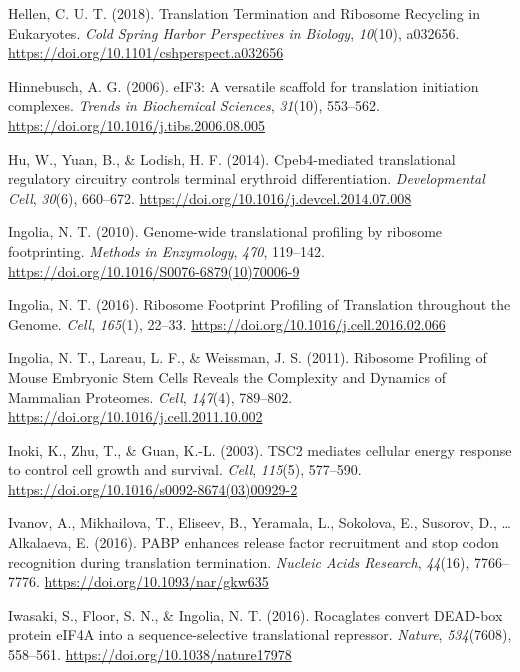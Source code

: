 \documentclass[12pt,openany]{book}
\begin{document}
\hypertarget{ref-Hellen2018}{}
Hellen, C. U. T. (2018). Translation Termination and Ribosome Recycling
in Eukaryotes. \emph{Cold Spring Harbor Perspectives in Biology},
\emph{10}(10), a032656.
\url{https://doi.org/10.1101/cshperspect.a032656}

\hypertarget{ref-Hinnebusch2006}{}
Hinnebusch, A. G. (2006). eIF3: A versatile scaffold for translation
initiation complexes. \emph{Trends in Biochemical Sciences},
\emph{31}(10), 553--562.
\url{https://doi.org/10.1016/j.tibs.2006.08.005}

\hypertarget{ref-Hu2014}{}
Hu, W., Yuan, B., \& Lodish, H. F. (2014). Cpeb4-mediated translational
regulatory circuitry controls terminal erythroid differentiation.
\emph{Developmental Cell}, \emph{30}(6), 660--672.
\url{https://doi.org/10.1016/j.devcel.2014.07.008}

\hypertarget{ref-Ingolia2010}{}
Ingolia, N. T. (2010). Genome-wide translational profiling by ribosome
footprinting. \emph{Methods in Enzymology}, \emph{470}, 119--142.
\url{https://doi.org/10.1016/S0076-6879(10)70006-9}

\hypertarget{ref-Ingolia2016}{}
Ingolia, N. T. (2016). Ribosome Footprint Profiling of Translation
throughout the Genome. \emph{Cell}, \emph{165}(1), 22--33.
\url{https://doi.org/10.1016/j.cell.2016.02.066}

\hypertarget{ref-Ingolia2011}{}
Ingolia, N. T., Lareau, L. F., \& Weissman, J. S. (2011). Ribosome
Profiling of Mouse Embryonic Stem Cells Reveals the Complexity and
Dynamics of Mammalian Proteomes. \emph{Cell}, \emph{147}(4), 789--802.
\url{https://doi.org/10.1016/j.cell.2011.10.002}

\hypertarget{ref-Inoki2003}{}
Inoki, K., Zhu, T., \& Guan, K.-L. (2003). TSC2 mediates cellular energy
response to control cell growth and survival. \emph{Cell},
\emph{115}(5), 577--590.
\url{https://doi.org/10.1016/s0092-8674(03)00929-2}

\hypertarget{ref-Ivanov2016}{}
Ivanov, A., Mikhailova, T., Eliseev, B., Yeramala, L., Sokolova, E.,
Susorov, D., \ldots{} Alkalaeva, E. (2016). PABP enhances release factor
recruitment and stop codon recognition during translation termination.
\emph{Nucleic Acids Research}, \emph{44}(16), 7766--7776.
\url{https://doi.org/10.1093/nar/gkw635}

\hypertarget{ref-Iwasaki2016}{}
Iwasaki, S., Floor, S. N., \& Ingolia, N. T. (2016). Rocaglates convert
DEAD-box protein eIF4A into a sequence-selective translational
repressor. \emph{Nature}, \emph{534}(7608), 558--561.
\url{https://doi.org/10.1038/nature17978}
\end{document}
